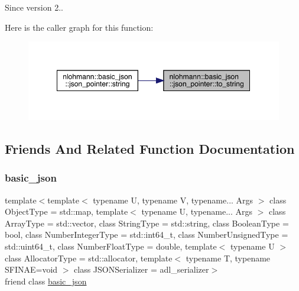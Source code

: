\begin{DoxySince}{Since}
version 2.. 
\end{DoxySince}
Here is the caller graph for this function\+:\nopagebreak
\begin{figure}[H]
\begin{center}
\leavevmode
\includegraphics[width=349pt]{classnlohmann_1_1basic__json_1_1json__pointer_adf63cdde9493796d8aa61bd948984b6d_icgraph}
\end{center}
\end{figure}


\subsection{Friends And Related Function Documentation}
\mbox{\label{classnlohmann_1_1basic__json_1_1json__pointer_ada3100cdb8700566051828f1355fa745}} 
\subsubsection{\texorpdfstring{basic\_json}{basic\_json}}
{\footnotesize\ttfamily template$<$template$<$ typename U, typename V, typename... Args $>$ class Object\+Type = std\+::map, template$<$ typename U, typename... Args $>$ class Array\+Type = std\+::vector, class String\+Type  = std\+::string, class Boolean\+Type  = bool, class Number\+Integer\+Type  = std\+::int64\+\_\+t, class Number\+Unsigned\+Type  = std\+::uint64\+\_\+t, class Number\+Float\+Type  = double, template$<$ typename U $>$ class Allocator\+Type = std\+::allocator, template$<$ typename T, typename S\+F\+I\+N\+A\+E=void $>$ class J\+S\+O\+N\+Serializer = adl\+\_\+serializer$>$ \\
friend class \mbox{\hyperlink{classnlohmann_1_1basic__json}{basic\+\_\+json}}\hspace{0.3cm}{\ttfamily [friend]}}



